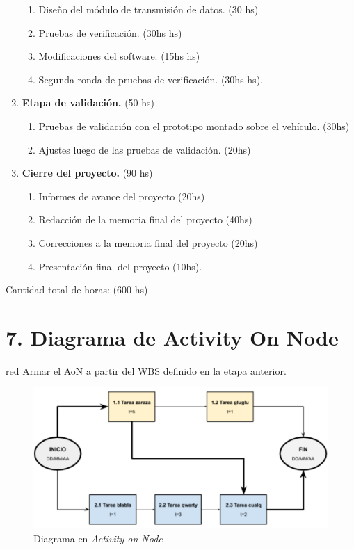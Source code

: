 \documentclass[11pt]{charter}
\begin{document}
\begin{enumerate}
\begin{enumerate}
	\item Diseño del módulo de transmisión de datos. (30 hs)
	\item Pruebas de verificación. (30hs hs)
	\item Modificaciones del software. (15hs hs)
	\item Segunda ronda de pruebas de verificación. (30hs hs).
	\end{enumerate}
\item \textbf{Etapa de validación.} (50 hs)
	\begin{enumerate}
	\item Pruebas de validación con el prototipo montado sobre el vehículo. (30hs)
	\item Ajustes luego de las pruebas de validación. (20hs)
	\end{enumerate}
\item \textbf{Cierre del proyecto.} (90 hs)
	\begin{enumerate}
	\item Informes de avance del proyecto (20hs)
	\item Redacción de la memoria final del proyecto (40hs)
	\item Correcciones a la memoria final del proyecto (20hs)
	\item Presentación final del proyecto (10hs).
	\end{enumerate}
\end{enumerate}

Cantidad total de horas: (600 hs)


\section{7. Diagrama de Activity On Node}
\label{sec:AoN}

\begin{consigna}{red}
Armar el AoN a partir del WBS definido en la etapa anterior. 



\end{consigna}

\begin{figure}[htpb]
\centering 
\includegraphics[width=.8\textwidth]{./Figuras/AoN.png}
\caption{Diagrama en \textit{Activity on Node}}
\label{fig:AoN}
\end{figure}
\end{document}
